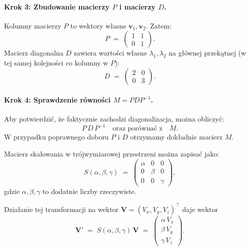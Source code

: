 \paragraph{Krok 3: Zbudowanie macierzy \(P\) i macierzy \(D\).}
Kolumny macierzy \(P\) to wektory własne \(\mathbf{v}_1, \mathbf{v}_2\). Zatem:
\[
P \;=\;
\begin{pmatrix}
1 & 1 \\
0 & 1
\end{pmatrix}.
\]
Macierz diagonalna \(D\) zawiera wartości własne \(\lambda_1, \lambda_2\) na głównej przekątnej (w tej samej kolejności co kolumny w \(P\)):
\[
D \;=\;
\begin{pmatrix}
2 & 0 \\
0 & 3
\end{pmatrix}.
\]

\paragraph{Krok 4: Sprawdzenie równości \(M = P D P^{-1}\).}
Aby potwierdzić, że faktycznie zachodzi diagonalizacja, można obliczyć:
\[
P\,D\,P^{-1}
\quad\text{oraz porównać z}\quad
M.
\]
W przypadku poprawnego doboru \(P\) i \(D\) otrzymamy dokładnie macierz \(M\).





\noindent
Macierz skalowania w trójwymiarowej przestrzeni można zapisać jako:
\[
S(\alpha,\beta,\gamma) 
\;=\;
\begin{pmatrix}
\alpha & 0      & 0 \\
0      & \beta  & 0 \\
0      & 0      & \gamma
\end{pmatrix},
\]
gdzie \(\alpha,\beta,\gamma\) to dodatnie liczby rzeczywiste.

\bigskip
\noindent
Działanie tej transformacji na wektor \(\mathbf{V} = (V_x, V_y, V_z)^\top\) daje wektor
\[
\mathbf{V}' \;=\; S(\alpha,\beta,\gamma)\,\mathbf{V}
\;=\;
\begin{pmatrix}
\alpha\,V_x \\
\beta\,V_y \\
\gamma\,V_z
\end{pmatrix}.
\]

